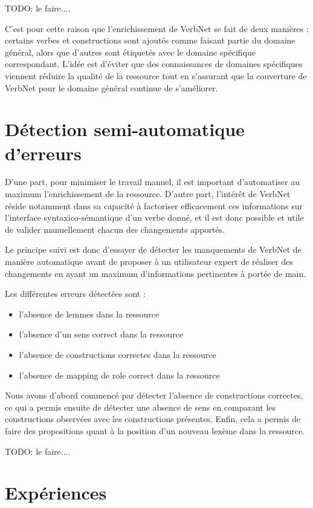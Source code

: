 TODO: le faire....

C'est pour cette raison que l'enrichissement de VerbNet se fait de deux
manières : certains verbes et constructions sont ajoutés comme faisant partie
du domaine général, alors que d'autres sont étiquetés avec le domaine
spécifique correspondant. L'idée est d'éviter que des connaissances de domaines
spécifiques viennent réduire la qualité de la ressource tout en s'assurant que
la couverture de VerbNet pour le domaine général continue de s'améliorer.

\section{Détection semi-automatique d'erreurs}

D'une part, pour minimiser le travail manuel, il est important d'automatiser au
maximum l'enrichissement de la ressource. D'autre part, l'intérêt de VerbNet
réside notamment dans sa capacité à factoriser efficacement ces informations
sur l'interface syntaxico-sémantique d'un verbe donné, et il est donc possible
et utile de valider manuellement chacun des changements apportés.

Le principe suivi est donc d'essayer de détecter les manquements de VerbNet de
manière automatique avant de proposer à un utilisateur expert de réaliser des
changements en ayant un maximum d'informations pertinentes à portée de main.

Les différentes erreurs détectées sont :
\begin{itemize}
    \item l'absence de lemmes dans la ressource
    \item l'absence d'un sens correct dans la ressource
    \item l'absence de constructions correctes dans la ressource
    \item l'absence de mapping de role correct dans la ressource
\end{itemize}

Nous avons d'abord commencé par détecter l'absence de constructions correctes,
ce qui a permis ensuite de détecter une absence de sens en comparant les
constructions observées avec les constructions présentes. Enfin, cela a permis
de faire des propositions quant à la position d'un nouveau lexème dans la
ressource.

TODO: le faire....

\section{Expériences}


